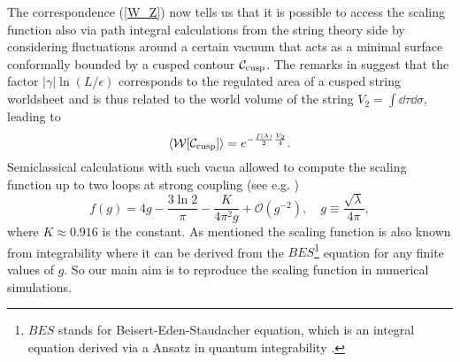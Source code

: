%
%
The correspondence (\ref{W_Z}) now tells us that it is possible to access the scaling function also via path integral calculations from the string theory side by considering fluctuations around a certain vacuum that acts as a minimal surface conformally bounded by a cusped contour $\mathcal{C}_{\rm cusp}$.  The remarks in \cite{Kruczenski:2002fb,Kruczenski:2007cy} suggest that the factor $\vert \gamma\vert \ln (L/\epsilon)$ corresponds to the regulated area of a cusped string worldsheet and is thus related to the world volume of the string $V_{2}=\int \dd\tau \dd \sigma$, leading to 
%
%
\begin{equation}
\langle \mathcal{W}[\mathcal{C_{\rm cusp}}] \rangle = e^{-\frac{f(\lambda)}{2}\frac{V_{2}}{4}}.
\end{equation}
Semiclassical calculations with such vacua allowed to compute the scaling function up to two loops at strong coupling (see e.g. \cite{Giombi:2009gd})
%
%
\begin{equation}
f(g) = 4g - \frac{3\ln 2}{\pi} - \frac{K}{4\pi^{2}g} + \mathcal{O}(g^{-2}), \quad g\equiv \frac{\sqrt{\lambda}}{4\pi},
\end{equation}
%
%
where $K\approx 0.916$ is the  constant. As mentioned the scaling function is also known from integrability where it can be derived from the $BES$\footnote{$BES$ stands for Beisert-Eden-Staudacher equation, which is an integral equation derived via a  Ansatz in quantum integrability \cite{Beisert:2006ez}.} equation for any finite values of $g$. So our main aim is to reproduce the scaling function in numerical simulations. 
%
%
%
%
%
%
%
%
%
